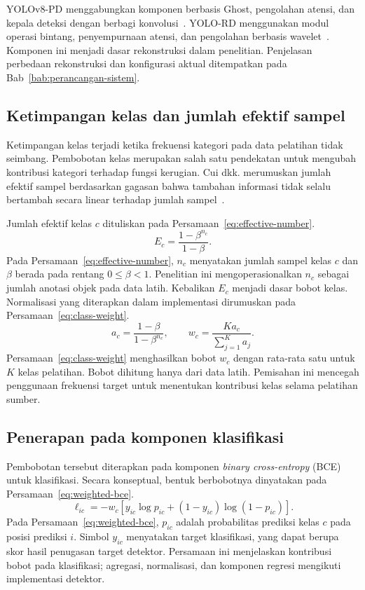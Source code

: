 YOLOv8-PD menggabungkan komponen berbasis Ghost, pengolahan atensi, dan kepala deteksi dengan berbagi konvolusi~\cite{Zeng2024}. YOLO-RD menggunakan modul operasi bintang, penyempurnaan atensi, dan pengolahan berbasis wavelet~\cite{Wang2025}. Komponen ini menjadi dasar rekonstruksi dalam penelitian. Penjelasan perbedaan rekonstruksi dan konfigurasi aktual ditempatkan pada Bab~\ref{bab:perancangan-sistem}.

\subsection{Ketimpangan kelas dan jumlah efektif sampel}
Ketimpangan kelas terjadi ketika frekuensi kategori pada data pelatihan tidak seimbang. Pembobotan kelas merupakan salah satu pendekatan untuk mengubah kontribusi kategori terhadap fungsi kerugian. Cui dkk. merumuskan jumlah efektif sampel berdasarkan gagasan bahwa tambahan informasi tidak selalu bertambah secara linear terhadap jumlah sampel~\cite{cui2019class}.

Jumlah efektif kelas $c$ dituliskan pada Persamaan~\eqref{eq:effective-number}.
\begin{equation}
E_c=\frac{1-\beta^{n_c}}{1-\beta}.
\label{eq:effective-number}
\end{equation}
Pada Persamaan~\eqref{eq:effective-number}, $n_c$ menyatakan jumlah sampel kelas $c$ dan $\beta$ berada pada rentang $0\leq\beta<1$. Penelitian ini mengoperasionalkan $n_c$ sebagai jumlah anotasi objek pada data latih. Kebalikan $E_c$ menjadi dasar bobot kelas. Normalisasi yang diterapkan dalam implementasi dirumuskan pada Persamaan~\eqref{eq:class-weight}.
\begin{equation}
a_c=\frac{1-\beta}{1-\beta^{n_c}},\qquad
w_c=\frac{K a_c}{\sum_{j=1}^{K}a_j}.
\label{eq:class-weight}
\end{equation}
Persamaan~\eqref{eq:class-weight} menghasilkan bobot $w_c$ dengan rata-rata satu untuk $K$ kelas pelatihan. Bobot dihitung hanya dari data latih. Pemisahan ini mencegah penggunaan frekuensi target untuk menentukan kontribusi kelas selama pelatihan sumber.

\subsection{Penerapan pada komponen klasifikasi}
Pembobotan tersebut diterapkan pada komponen \textit{binary cross-entropy} (BCE) untuk klasifikasi. Secara konseptual, bentuk berbobotnya dinyatakan pada Persamaan~\eqref{eq:weighted-bce}.
\begin{equation}
\ell_{ic}=-w_c\left[y_{ic}\log p_{ic}+(1-y_{ic})\log(1-p_{ic})\right].
\label{eq:weighted-bce}
\end{equation}
Pada Persamaan~\eqref{eq:weighted-bce}, $p_{ic}$ adalah probabilitas prediksi kelas $c$ pada posisi prediksi $i$. Simbol $y_{ic}$ menyatakan target klasifikasi, yang dapat berupa skor hasil penugasan target detektor. Persamaan ini menjelaskan kontribusi bobot pada klasifikasi; agregasi, normalisasi, dan komponen regresi mengikuti implementasi detektor.

